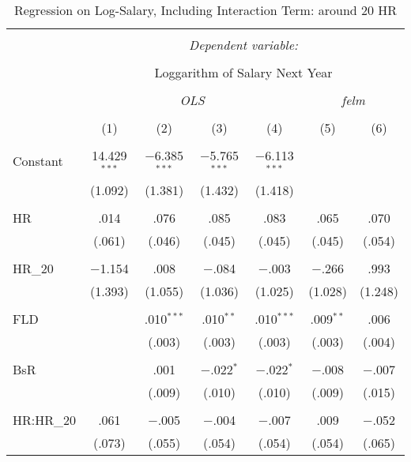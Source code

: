 
\begin{table}[H] \centering
  \caption{Regression on Log-Salary, Including Interaction Term: around 20 HR}
  \label{HR20_A}
\tiny
\begin{tabular}{@{\extracolsep{5pt}}lcccccc}
\\[-1.8ex]\hline
\hline \\[-1.8ex]
 & \multicolumn{6}{c}{\textit{Dependent variable:}} \\
\cline{2-7}
\\[-1.8ex] & \multicolumn{6}{c}{Loggarithm of Salary Next Year} \\
\\[-1.8ex] & \multicolumn{4}{c}{\textit{OLS}} & \multicolumn{2}{c}{\textit{felm}} \\
\\[-1.8ex] & (1) & (2) & (3) & (4) & (5) & (6)\\
\hline \\[-1.8ex]
 Constant & 14.429$^{***}$ & $-$6.385$^{***}$ & $-$5.765$^{***}$ & $-$6.113$^{***}$ &  &  \\
  & (1.092) & (1.381) & (1.432) & (1.418) &  &  \\
  & & & & & & \\
 HR & .014 & .076 & .085 & .083 & .065 & .070 \\
  & (.061) & (.046) & (.045) & (.045) & (.045) & (.054) \\
  & & & & & & \\
 HR\_20 & $-$1.154 & .008 & $-$.084 & $-$.003 & $-$.266 & .993 \\
  & (1.393) & (1.055) & (1.036) & (1.025) & (1.028) & (1.248) \\
  & & & & & & \\
 FLD &  & .010$^{***}$ & .010$^{**}$ & .010$^{***}$ & .009$^{**}$ & .006 \\
  &  & (.003) & (.003) & (.003) & (.003) & (.004) \\
  & & & & & & \\
 BsR &  & .001 & $-$.022$^{*}$ & $-$.022$^{*}$ & $-$.008 & $-$.007 \\
  &  & (.009) & (.010) & (.010) & (.009) & (.015) \\
  & & & & & & \\
 HR:HR\_20 & .061 & $-$.005 & $-$.004 & $-$.007 & .009 & $-$.052 \\
  & (.073) & (.055) & (.054) & (.054) & (.054) & (.065) \\

\end{tabular}
\end{table}
